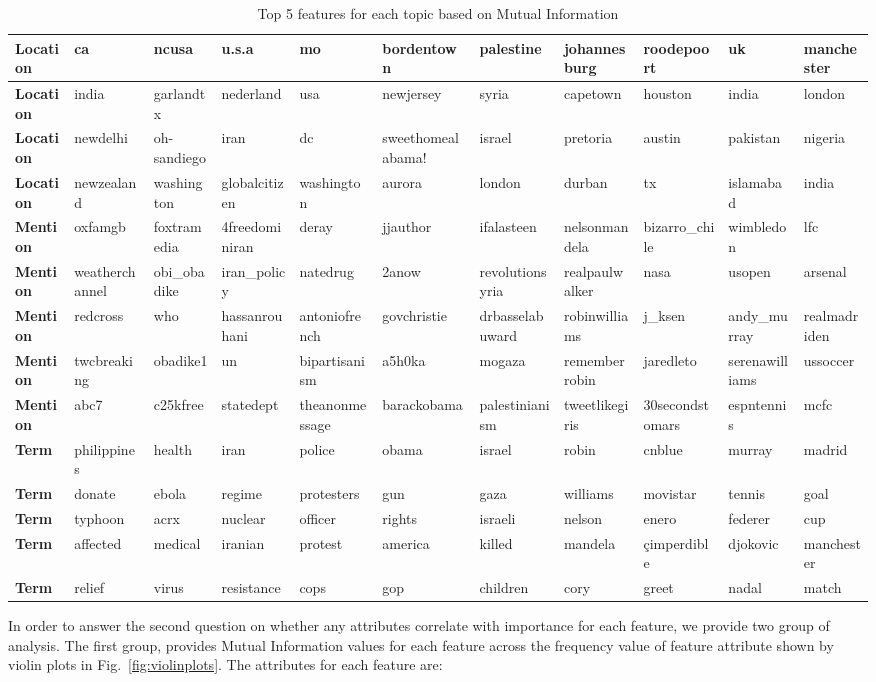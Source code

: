 \begin{table}[ht]
{{\begin{tabular}{|l|l|l|l|l|l|l|l|l|l|l|}
\textbf{Location} & ca & ncusa & u.s.a & mo & bordentown & palestine & johannesburg & roodepoort & uk & manchester \\ \hline
\textbf{Location} & india & garlandtx & nederland & usa & newjersey & syria & capetown & houston & india & london \\ \hline
\textbf{Location} & newdelhi & oh-sandiego & iran & dc & sweethomealabama! & israel & pretoria & austin & pakistan & nigeria \\ \hline
\textbf{Location} & newzealand & washington & globalcitizen & washington & aurora & london & durban & tx & islamabad & india \\ \hline \hline
\textbf{Mention} & oxfamgb & foxtramedia & 4freedominiran & deray & jjauthor & ifalasteen & nelsonmandela & bizarro\_chile & wimbledon & lfc \\ \hline
\textbf{Mention} & weatherchannel & obi\_obadike & iran\_policy & natedrug & 2anow & revolutionsyria & realpaulwalker & nasa & usopen & arsenal \\ \hline
\textbf{Mention} & redcross & who & hassanrouhani & antoniofrench & govchristie & drbasselabuward & robinwilliams & j\_ksen & andy\_murray & realmadriden \\ \hline
\textbf{Mention} & twcbreaking & obadike1 & un & bipartisanism & a5h0ka & mogaza & rememberrobin & jaredleto & serenawilliams & ussoccer \\ \hline
\textbf{Mention} & abc7 & c25kfree & statedept & theanonmessage & barackobama & palestinianism & tweetlikegiris & 30secondstomars & espntennis & mcfc \\ \hline \hline
\textbf{Term} & philippines & health & iran & police & obama & israel & robin & cnblue & murray & madrid \\ \hline
\textbf{Term} & donate & ebola & regime & protesters & gun & gaza & williams & movistar & tennis & goal \\ \hline
\textbf{Term} & typhoon & acrx & nuclear & officer & rights & israeli & nelson & enero & federer & cup \\ \hline
\textbf{Term} & affected & medical & iranian & protest & america & killed & mandela & çimperdible & djokovic & manchester \\ \hline
\textbf{Term} & relief & virus & resistance & cops & gop & children & cory & greet & nadal & match \\ \hline
\end{tabular}
}}
\caption{Top 5 features for each topic based on Mutual Information}
\label{table:top10MItopicsLocations}
\end{table}
In order to answer the second question on whether any attributes correlate with importance for each feature, we provide two group of analysis. The first group, provides Mutual Information values for each feature across the frequency value of feature attribute shown by violin plots in Fig.~\ref{fig:violinplots}. The attributes for each feature are:


